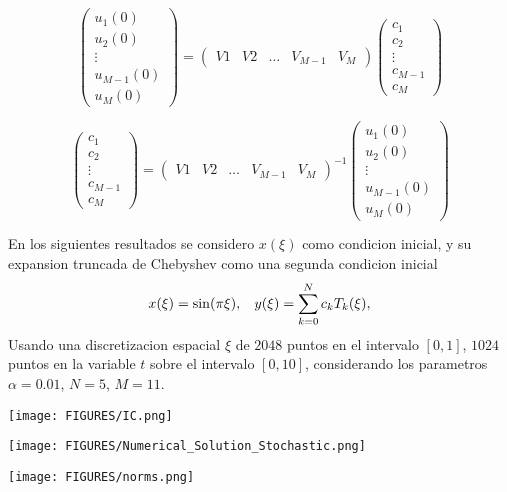 \begin{frame}
	\begin{equation*}	
	\begin{pmatrix}
	u_1 (0) \\ u_2 (0) \\ \vdots \\ u_{M-1} (0) \\	u_M (0)
	\end{pmatrix}
	= 
	\begin{pmatrix}
	V1 & V2 & \dots & V_{M-1} & V_M
	\end{pmatrix}
	\begin{pmatrix}
	c_1 \\ c_2 \\ \vdots \\ c_{M-1} \\ c_M
	\end{pmatrix}
	\end{equation*}
	
	\begin{equation*}
	\begin{pmatrix}
	c_1 \\ c_2 \\ \vdots \\ c_{M-1} \\ c_M 
	\end{pmatrix}
	=	
	\begin{pmatrix}
	V1 & V2 & \dots & V_{M-1} & V_M
	\end{pmatrix}^{-1}
	\begin{pmatrix}
	u_1 (0) \\ u_2 (0) \\ \vdots \\ u_{M-1} (0) \\	u_M (0)
	\end{pmatrix}
	\end{equation*}
\end{frame}

\begin{frame}
	En los siguientes resultados se considero $x(\xi)$ como condicion inicial, y su expansion truncada de Chebyshev como una segunda condicion inicial
	\begin{align*}
		x(\xi) = \sin(\pi \xi), \hspace{3mm} y(\xi) = \displaystyle \sum^{N}_{k=0} c_k T_k (\xi),
	\end{align*}
	Usando una discretizacion espacial $\xi$ de $2048$ puntos en el intervalo $[0, 1]$, $1024$ puntos en la variable $t$ sobre el intervalo $[0, 10]$, considerando los parametros $\alpha = 0.01$, $N = 5$, $M = 11$.
\end{frame}

\begin{frame}	
	\centering	
	\texttt{[image: FIGURES/IC.png]}
\end{frame}

\begin{frame}
	\centering
	\texttt{[image: FIGURES/Numerical\_Solution\_Stochastic.png]}
\end{frame}

\begin{frame}	
	\centering
	\texttt{[image: FIGURES/norms.png]}
\end{frame}